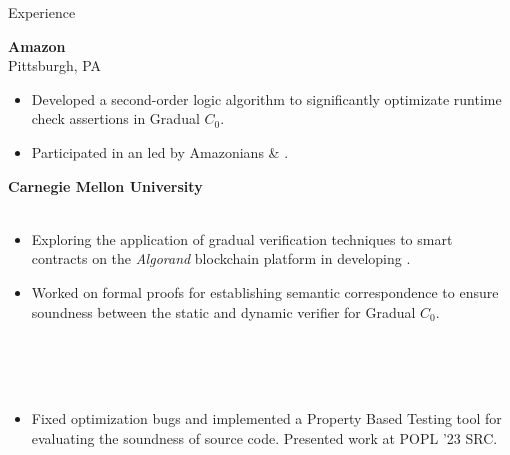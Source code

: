 \begin{rSection}{Experience}
	{\textbf{\large{Amazon}} \hfill \color{darkgray}{06/2023 - 08/2023} 
	\\ \vspace*{1mm}
	 \hfill{Pittsburgh, PA} 
	\\ 
	\color{black}
	\begin{minipage}{40em}
		\begin{itemize}
			\item Developed a second-order logic algorithm to significantly optimizate runtime check assertions in Gradual $C_0$.
			\item Participated in an \href{https://s3d.cmu.edu/sure/index.html}{} led by Amazonians \href{https://www.linkedin.com/in/myles-shiroma-a850a89/}{} \& \href{https://www.linkedin.com/in/korin-torrence-johnson/}{}.
		\end{itemize}
	\end{minipage}}

	{\textbf{\large{Carnegie Mellon University}} \hfill \color{darkgray}{06/2022 - Present} 
	\\ \vspace*{1mm}
	 \hfill \color{darkgray}{Pittsburgh, PA} 
	\\ 
	\color{black}
	\begin{minipage}{40em}
		\begin{itemize}
			\item Exploring the application of gradual verification techniques to smart contracts on the \textit{Algorand} blockchain platform in developing \href{https://github.com/gradual-verification/gradual-TEAL}{}.
			\item Worked on formal proofs for establishing semantic correspondence to ensure soundness between the static and dynamic verifier for Gradual $C_0$. 
		\end{itemize}
	\end{minipage}} 
	\\
	\\
	\\
	\color{black}
	\begin{minipage}{40em}
		\begin{itemize}
			\item Fixed optimization bugs and implemented a Property Based Testing tool for evaluating the soundness of \href{https://github.com/gradual-verification/gvc0}{} source code. Presented work at POPL '23 SRC.
		\end{itemize}
	\end{minipage}


\end{rSection}
